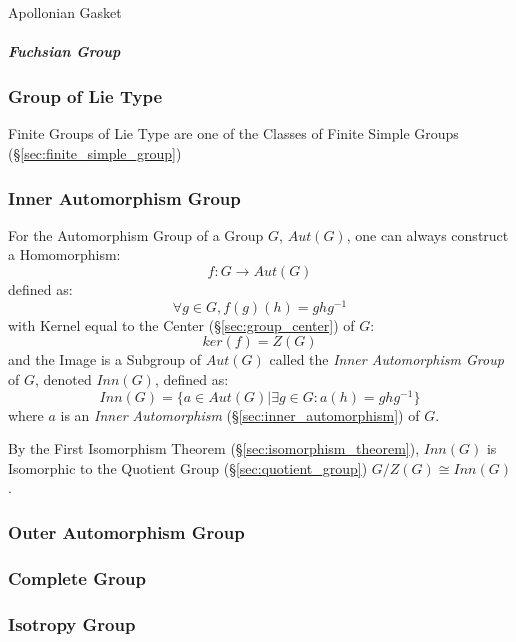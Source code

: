 Apollonian Gasket



\subparagraph{Fuchsian Group}\label{sec:fuchsian_group}\hfill



\subsubsection{Group of Lie Type}\label{sec:lie_type_group}

Finite Groups of Lie Type are one of the Classes of Finite Simple Groups
(\S\ref{sec:finite_simple_group})



\subsubsection{Inner Automorphism Group}\label{sec:inner_automorphism_group}

For the Automorphism Group of a Group $G$, $Aut(G)$, one can always
construct a Homomorphism:
\[
    f : G \rightarrow Aut(G)
\]
defined as:
\[
    \forall g \in G, f (g) (h) = g h g^{-1}
\]
with Kernel equal to the Center (\S\ref{sec:group_center}) of $G$:
\[
    ker(f) = Z(G)
\]
and the Image is a Subgroup of $Aut(G)$ called the \emph{Inner
  Automorphism Group} of $G$, denoted $Inn(G)$, defined as:
\[
    Inn(G) = \{ a \in Aut(G) | \exists g \in G : a(h) = g h g^{-1} \}
\]
where $a$ is an \emph{Inner Automorphism}
(\S\ref{sec:inner_automorphism}) of $G$.

By the First Isomorphism Theorem (\S\ref{sec:isomorphism_theorem}),
$Inn(G)$ is Isomorphic to the Quotient Group
(\S\ref{sec:quotient_group}) $G / Z(G) \cong Inn(G)$.



\subsubsection{Outer Automorphism Group}\label{sec:outer_automorphism_group}

\subsubsection{Complete Group}\label{sec:complete_group}

\subsubsection{Isotropy Group}\label{sec:isotropy_group}

